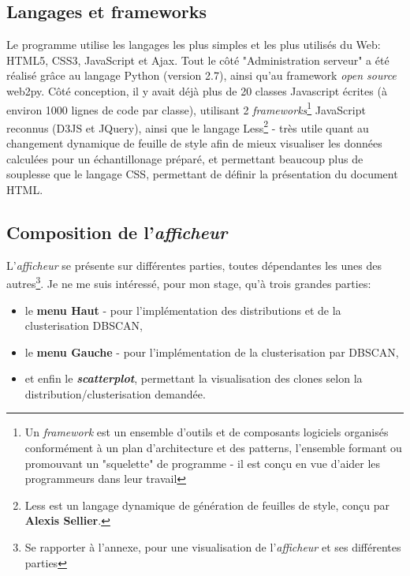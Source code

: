 \documentclass[12pt]{report}
\begin{document}
\begin{spacing}{1.2}
\subsection{Langages et frameworks}
Le programme utilise les langages les plus simples et les plus utilisés du Web: HTML5, CSS3, JavaScript et Ajax.
\newline
Tout le côté "Administration serveur" a été réalisé grâce au langage Python (version 2.7), ainsi qu'au framework \textit{open source} web2py.
\newline
Côté conception, il y avait déjà plus de 20 classes Javascript écrites (à environ 1000 lignes de code par classe), utilisant 2 \textit{frameworks}\footnote{Un \textit{framework} est un ensemble d'outils et de composants logiciels organisés conformément à un plan d'architecture et des patterns, l'ensemble formant ou promouvant un "squelette" de programme - il est conçu en vue d'aider les programmeurs dans leur travail} JavaScript reconnus (D3JS et JQuery), ainsi que le langage Less\footnote{Less est un langage dynamique de génération de feuilles de style, conçu par \textbf{Alexis Sellier}.} - très utile quant au changement dynamique de feuille de style afin de mieux visualiser les données calculées pour un échantillonage préparé, et permettant beaucoup plus de souplesse que le langage CSS, permettant de définir la présentation du document HTML.

\subsection{Composition de l'\textit{afficheur}}

L'\textit{afficheur} se présente sur différentes parties, toutes dépendantes les unes des autres\footnote{Se rapporter à l'annexe, pour une visualisation de l'\textit{afficheur} et ses différentes parties}.
\newline Je ne me suis intéressé, pour mon stage, qu'à trois grandes parties:
\begin{itemize}
\item{le \textbf{menu Haut} - pour l'implémentation des distributions et de la clusterisation DBSCAN,}
\item{le \textbf{menu Gauche} - pour l'implémentation de la clusterisation par DBSCAN,}
\item{et enfin le \textbf{\textit{scatterplot}}, permettant la visualisation des clones selon la distribution/clusterisation demandée.}
\end{itemize}


\end{spacing}
\end{document}
